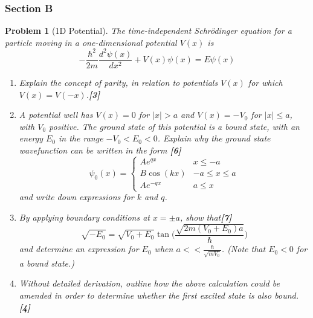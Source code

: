 \documentclass[a4paper]{article}
\theoremstyle{new}
\newtheorem{qns}{Problem}[subsection]
\begin{document}
\subsubsection{Section B}
\begin{qns}[1D Potential]
The time-independent Schrödinger equation for a particle moving in a one-dimensional potential $V(x)$ is
$$-\frac{\hbar^2}{2m}\frac{d^2\psi(x)}{dx^2}+V(x)\psi(x)=E\psi(x)$$
\begin{enumerate}[label=(\roman*)]
\item Explain the concept of parity, in relation to potentials $V(x)$ for which $V(x) = V(−x)$.\hfill\textbf{[3]}
\item A potential well has $V(x) = 0$ for $|x| > a$ and $V(x) = −V_0$ for $|x|\leq a$, with $V_0$ positive. The ground state of this potential is a bound state, with an energy $E_0$ in the range $−V_0 < E_0 < 0$. Explain why the ground state wavefunction can be written in the form \hfill\textbf{[6]}
$$\psi_0(x)=
\left\{
        \begin{array}{ll}
      Ae^{qx} & x\leq-a \\
      B\cos(kx) & -a\leq x\leq a\\
      Ae^{-qx} & a\leq x
        \end{array}
    \right.$$
and write down expressions for $k$ and $q$.
\item By applying boundary conditions at $x=\pm a$, show that\hfill\textbf{[7]}
$$\sqrt{-E_0}=\sqrt{V_0+E_0}\tan\bigg(\frac{\sqrt{2m(V_0+E_0)a}}{\hbar}\bigg)$$
and determine an expression for $E_0$ when $a<<\frac{\hbar}{\sqrt{mV_0}}$. (Note that $E_0 < 0$ for a bound state.)
\item Without detailed derivation, outline how the above calculation could be amended in order to determine whether the first excited state is also bound.\hfill\textbf{[4]}
\end{enumerate}
\end{qns}
\end{document}
